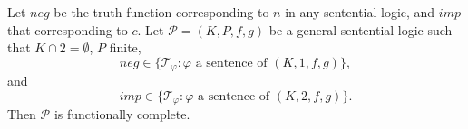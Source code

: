 Let $\mathit{neg}$ be the truth function corresponding to $n$ in any sentential logic, and $\mathit{imp}$ that corresponding to $c$. Let $\mathcal{P} = (K, P, f, g)$ be a general sentential logic such that $K \cap 2 = \emptyset$, $P$ finite,
$$\mathit{neg} \in \{\mathcal{T}_{\varphi} : \varphi \text{ a sentence of } (K, 1, f, g)\},$$
and
$$\mathit{imp} \in \{\mathcal{T}_{\varphi} : \varphi \text{ a sentence of } (K, 2, f, g)\}.$$
Then $\mathcal{P}$ is functionally complete.
